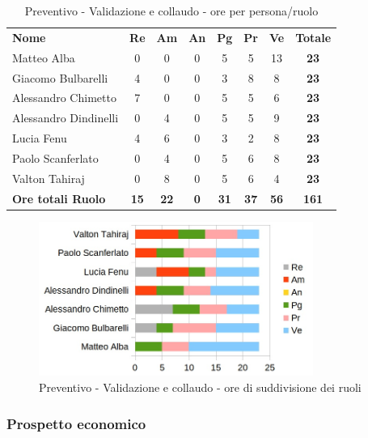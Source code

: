 		\begin{table} [h!]
			\begin{center}
				\begin{tabular} { m{3.5cm} c c c c c c c }
					\rowcolor{lightgray}
					\textbf{Nome} & \textbf{Re} & \textbf{Am} & \textbf{An} & \textbf{Pg} & \textbf{Pr} & \textbf{Ve} & \textbf{Totale} \\
					Matteo Alba & 0& 0&0 & 5 & 5 & 13 & \textbf{23} \\
					Giacomo Bulbarelli & 4 & 0&0 & 3 & 8 & 8 & \textbf{23} \\
					Alessandro Chimetto & 7 & 0& 0& 5 & 5 & 6 & \textbf{23} \\
					Alessandro Dindinelli &0 & 4 &0 & 5 & 5 & 9 & \textbf{23} \\
					Lucia Fenu & 4 & 6 & 0& 3 & 2 & 8 & \textbf{23} \\
					Paolo Scanferlato &0 & 4 & 0& 5 & 6 & 8 & \textbf{23} \\
					Valton Tahiraj &0 & 8 &0 & 5 & 6 & 4 & \textbf{23} \\
					\textbf{Ore totali Ruolo} & \textbf{15} & \textbf{22} & \textbf{0} & \textbf{31} & \textbf{37}& \textbf{56} & \textbf{161}
				\end{tabular}
				\caption{Preventivo - Validazione e collaudo - ore per persona/ruolo}
			\end{center}
		\end{table}
	
		\begin{figure} [h!]
			\centering
			\includegraphics[width=0.8\textwidth]{res/img/grafici/validazione_e_collaudo_ore_ruolo.jpg}
			\caption{Preventivo - Validazione e collaudo - ore di suddivisione dei ruoli} 
		\end{figure}
	
	\newpage
	
	\subsubsection{Prospetto economico}
	
